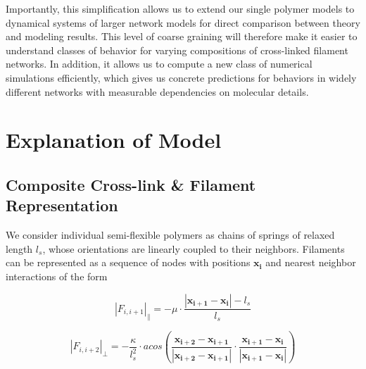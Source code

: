 \documentclass[pre,reprint]{revtex4-1}
\begin{document}
Importantly, this simplification allows us to extend our single polymer models to dynamical systems of larger network models for direct comparison between theory and modeling results.  This level of coarse graining will therefore make it easier to understand classes of behavior for varying compositions of cross-linked filament networks.  In addition, it allows us to compute a new class of numerical simulations efficiently, which gives us concrete predictions for behaviors in widely different networks with measurable dependencies on molecular details.



































\section{Explanation of Model}

\subsection{Composite Cross-link \& Filament Representation}
We consider individual semi-flexible polymers as chains of springs of relaxed length $l_s$, whose orientations are linearly coupled to their neighbors. Filaments can be represented as a sequence of nodes with positions $\mathbf{x_i}$ and nearest neighbor interactions of the form

\begin{equation}
|F_{i,i+1}|_{\parallel} = -\mu\cdot\frac{|\mathbf{x_{i+1}}-\mathbf{x_i}|-l_s}{l_s} 
\end{equation}

\begin{equation}
|F_{i,i+2}|_{\perp} = -\frac{\kappa}{l_s^2}\cdot acos\left (\frac{\mathbf{x_{i+2}}-\mathbf{x_{i+1}}}{|\mathbf{x_{i+2}}-\mathbf{x_{i+1}}|} \cdot\frac{\mathbf{x_{i+1}}-\mathbf{x_i}}{|\mathbf{x_{i+1}}-\mathbf{x_i}|} \right ) 
\end{equation}
\end{document}
